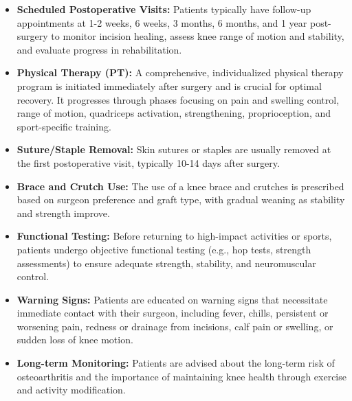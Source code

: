\begin{itemize}
  \item \textbf{Scheduled Postoperative Visits:} Patients typically have follow-up appointments at 1-2 weeks, 6 weeks, 3 months, 6 months, and 1 year post-surgery to monitor incision healing, assess knee range of motion and stability, and evaluate progress in rehabilitation.
  
  \item \textbf{Physical Therapy (PT):} A comprehensive, individualized physical therapy program is initiated immediately after surgery and is crucial for optimal recovery. It progresses through phases focusing on pain and swelling control, range of motion, quadriceps activation, strengthening, proprioception, and sport-specific training.
  
  \item \textbf{Suture/Staple Removal:} Skin sutures or staples are usually removed at the first postoperative visit, typically 10-14 days after surgery.
  
  \item \textbf{Brace and Crutch Use:} The use of a knee brace and crutches is prescribed based on surgeon preference and graft type, with gradual weaning as stability and strength improve.
  
  \item \textbf{Functional Testing:} Before returning to high-impact activities or sports, patients undergo objective functional testing (e.g., hop tests, strength assessments) to ensure adequate strength, stability, and neuromuscular control.
  
  \item \textbf{Warning Signs:} Patients are educated on warning signs that necessitate immediate contact with their surgeon, including fever, chills, persistent or worsening pain, redness or drainage from incisions, calf pain or swelling, or sudden loss of knee motion.
  
  \item \textbf{Long-term Monitoring:} Patients are advised about the long-term risk of osteoarthritis and the importance of maintaining knee health through exercise and activity modification.
\end{itemize}

